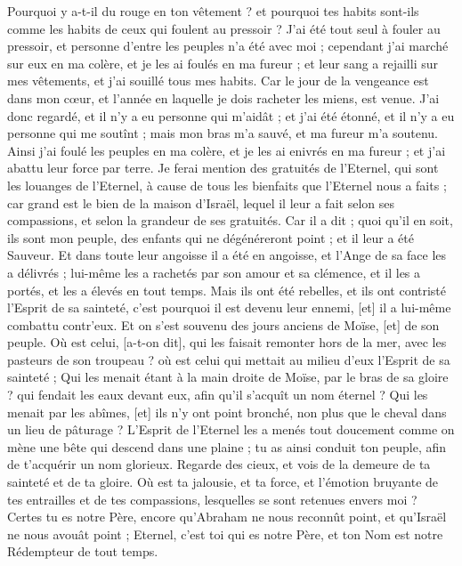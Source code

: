 \begin{multicols}{2}
Pourquoi y a-t-il du rouge en ton vêtement ? et pourquoi tes habits sont-ils comme les habits de ceux qui foulent au pressoir ?
J'ai été tout seul à fouler au pressoir, et personne d'entre les peuples n'a été avec moi ; cependant j'ai marché sur eux en ma colère, et je les ai foulés en ma fureur ; et leur sang a rejailli sur mes vêtements, et j'ai souillé tous mes habits.
Car le jour de la vengeance est dans mon cœur, et l'année en laquelle je dois racheter les miens, est venue.
J'ai donc regardé, et il n'y a eu personne qui m'aidât ; et j'ai été étonné, et il n'y a eu personne qui me soutînt ; mais mon bras m'a sauvé, et ma fureur m'a soutenu.
Ainsi j'ai foulé les peuples en ma colère, et je les ai enivrés en ma fureur ; et j'ai abattu leur force par terre.
Je ferai mention des gratuités de l'Eternel, qui sont les louanges de l'Eternel, à cause de tous les bienfaits que l'Eternel nous a faits ; car grand est le bien de la maison d'Israël, lequel il leur a fait selon ses compassions, et selon la grandeur de ses gratuités.
Car il a dit ; quoi qu'il en soit, ils sont mon peuple, des enfants qui ne dégénéreront point ; et il leur a été Sauveur.
Et dans toute leur angoisse il a été en angoisse, et l'Ange de sa face les a délivrés ; lui-même les a rachetés par son amour et sa clémence, et il les a portés, et les a élevés en tout temps.
Mais ils ont été rebelles, et ils ont contristé l'Esprit de sa sainteté, c'est pourquoi il est devenu leur ennemi, [et] il a lui-même combattu contr'eux.
Et on s'est souvenu des jours anciens de Moïse, [et] de son peuple. Où est celui, [a-t-on dit], qui les faisait remonter hors de la mer, avec les pasteurs de son troupeau ? où est celui qui mettait au milieu d'eux l'Esprit de sa sainteté ;
Qui les menait étant à la main droite de Moïse, par le bras de sa gloire ? qui fendait les eaux devant eux, afin qu'il s'acquît un nom éternel ?
Qui les menait par les abîmes, [et] ils n'y ont point bronché, non plus que le cheval dans un lieu de pâturage ?
L'Esprit de l'Eternel les a menés tout doucement comme on mène une bête qui descend dans une plaine ; tu as ainsi conduit ton peuple, afin de t'acquérir un nom glorieux.
Regarde des cieux, et vois de la demeure de ta sainteté et de ta gloire. Où est ta jalousie, et ta force, et l'émotion bruyante de tes entrailles et de tes compassions, lesquelles se sont retenues envers moi ?
Certes tu es notre Père, encore qu'Abraham ne nous reconnût point, et qu'Israël ne nous avouât point ; Eternel, c'est toi qui es notre Père, et ton Nom est notre Rédempteur de tout temps.

\end{multicols}
